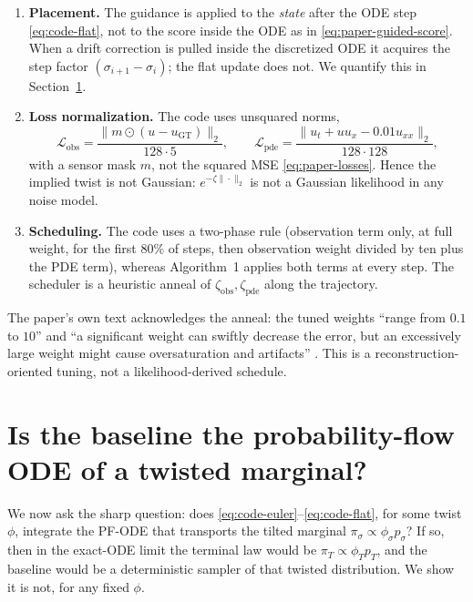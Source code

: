 \documentclass[11pt]{article}
\begin{document}
\begin{enumerate}
\item \textbf{Placement.} The guidance is applied to the \emph{state} after the ODE step
\eqref{eq:code-flat}, not to the score inside the ODE as in \eqref{eq:paper-guided-score}. When a
drift correction is pulled inside the discretized ODE it acquires the step factor
$(\sigma_{i+1}-\sigma_i)$; the flat update does not. We quantify this in
Section~\ref{sec:target}.
\item \textbf{Loss normalization.} The code uses unsquared norms,
\begin{equation}\label{eq:code-losses}
  \mathcal L_{\mathrm{obs}} = \frac{\bigl\|m\odot(u-u_{\mathrm{GT}})\bigr\|_2}{128\cdot 5},
  \qquad
  \mathcal L_{\mathrm{pde}} = \frac{\bigl\|u_t+uu_x-0.01u_{xx}\bigr\|_2}{128\cdot 128},
\end{equation}
with a sensor mask $m$, not the squared MSE \eqref{eq:paper-losses}. Hence the implied twist is not
Gaussian: $e^{-\zeta\|\cdot\|_2}$ is not a Gaussian likelihood in any noise model.
\item \textbf{Scheduling.} The code uses a two-phase rule (observation term only, at full weight,
for the first $80\%$ of steps, then observation weight divided by ten plus the PDE term), whereas
Algorithm~1 applies both terms at every step. The scheduler is a heuristic anneal of
$\zeta_{\mathrm{obs}},\zeta_{\mathrm{pde}}$ along the trajectory.
\end{enumerate}

The paper's own text acknowledges the anneal: the tuned weights ``range from $0.1$ to $10$'' and
``a significant weight can swiftly decrease the error, but an excessively large weight might cause
oversaturation and artifacts'' \citep{huang2024diffusionpde}. This is a reconstruction-oriented
tuning, not a likelihood-derived schedule.

\section{Is the baseline the probability-flow ODE of a twisted marginal?}\label{sec:target}

We now ask the sharp question: does \eqref{eq:code-euler}--\eqref{eq:code-flat}, for some twist
$\phi$, integrate the PF-ODE that transports the tilted marginal
$\pi_\sigma\propto\phi_\sigma p_\sigma$? If so, then in the exact-ODE limit the terminal law would
be $\pi_T\propto \phi_T p_T$, and the baseline would be a deterministic sampler of that twisted
distribution. We show it is not, for any fixed $\phi$.
\end{document}

